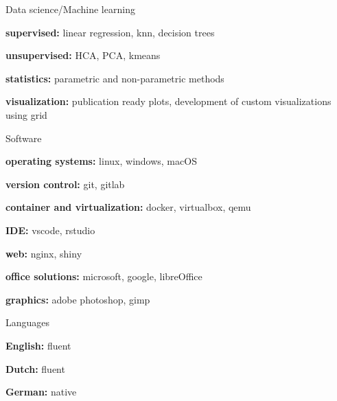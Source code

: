 \begin{cvskills}
  \cvskill
    {Data science/Machine learning}%
    {
      \begin{cvitems}
        \item {\textbf{supervised:} linear regression, knn, decision trees}
        \item {\textbf{unsupervised:} HCA, PCA, kmeans}
        \item {\textbf{statistics:} parametric and non-parametric methods}
        \item {\textbf{visualization:} publication ready plots, development of custom visualizations using grid}
      \end{cvitems}
    }
  \cvskill
    {Software}%
    {
      \begin{cvitems}
        \item {\textbf{operating systems:} linux, windows, macOS}
        \item {\textbf{version control:} git, gitlab}
        \item {\textbf{container and virtualization:} docker, virtualbox, qemu}
        \item {\textbf{IDE:} vscode, rstudio}
        \item {\textbf{web:} nginx, shiny}
        \item {\textbf{office solutions:} microsoft, google, libreOffice}
        \item {\textbf{graphics:} adobe photoshop, gimp}
      \end{cvitems}
    }
  \cvskill
    {Languages} %
    {
      \begin{cvitems}
        \item {\textbf{English:} fluent}
        \item {\textbf{Dutch:} fluent}
        \item {\textbf{German:} native}
      \end{cvitems}
    }
\end{cvskills}
